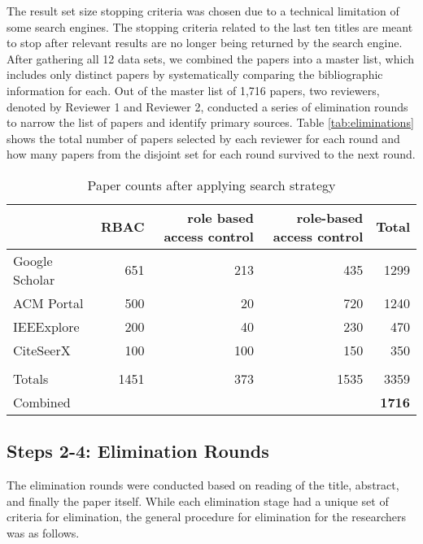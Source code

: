 The result set size stopping criteria was chosen due to a technical limitation of some search engines.  The stopping criteria related to the last ten titles are meant to stop after relevant results are no longer being returned by the search engine.  After gathering all 12 data sets, we combined the papers into a master list, which includes only distinct papers by systematically comparing the bibliographic information for each.
Out of the master list of 1,716 papers, two reviewers, denoted by Reviewer 1 and Reviewer 2, conducted a series of elimination rounds to narrow the list of papers and identify primary sources. Table \ref{tab:eliminations} shows the total number of papers selected by each reviewer for each round and how many papers from the disjoint set for each round survived to the next round.

\begin{table}
\centering
\caption{Paper counts after applying search strategy}
\vspace{0.1 in}
\begin{tabular}{ | l | r | r | r | r | }

\hline
 & 
\textbf{RBAC} & 
\textbf{role based access control} & 
\textbf{role-based access control} & 
\textbf{Total}
\\\hline

Google Scholar & 651 & 213 & 435 & 1299 \\\hline
ACM Portal & 500 & 20 & 720 & 1240 \\\hline
IEEExplore & 200 & 40 & 230 & 470 \\\hline
CiteSeerX & 100 & 100 & 150 & 350 \\\hline
 &  &  &  & \\\hline
Totals & 1451 & 373 & 1535 & 3359 \\\hline
Combined &  &  &  & \textbf{1716} \\\hline

\end{tabular}
\label{tab:search_results}
\end{table}

\subsection{Steps 2-4: Elimination Rounds}

The elimination rounds were conducted based on reading of the title, abstract, and finally the paper itself.  While each elimination stage had a unique set of criteria for elimination, the general procedure for elimination for the researchers was as follows.

